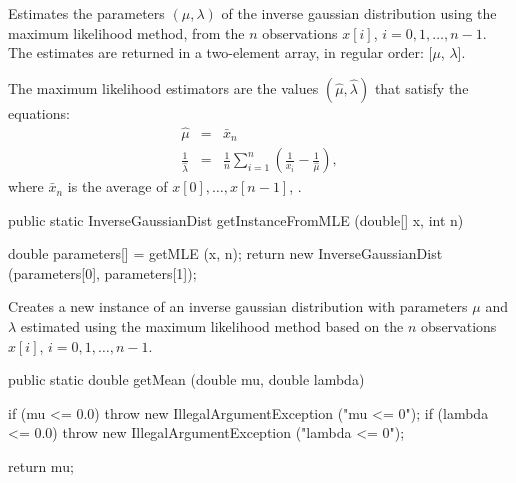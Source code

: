 \begin{tabb}
   Estimates the parameters $(\mu, \lambda)$ of the inverse gaussian distribution
   using the maximum likelihood method, from the $n$ observations
   $x[i]$, $i = 0, 1,\ldots, n-1$. The estimates are returned in a two-element
    array, in regular order: [$\mu$, $\lambda$]. 
   \begin{detailed}
   The maximum likelihood estimators are the values $(\hat\mu , \hat\lambda)$ 
   that satisfy the equations:
   \begin{eqnarray*}
      \hat{\mu} & = & \bar{x}_n \\[5pt]
      \frac{1}{\hat{\lambda}} & = & \frac{1}{n} \sum_{i=1}^{n}
    \left(\frac{1}{x_i} - \frac{1}{\hat{\mu}}\right),
   \end{eqnarray*}
   where $\bar x_n$ is the average of $x[0],\dots,x[n-1]$, 
    \cite[page 271]{tJOH95a}.
   \end{detailed}
\end{tabb}
\begin{htmlonly}
\end{htmlonly}
\begin{code}

   public static InverseGaussianDist getInstanceFromMLE (double[] x, int n)\begin{hide} {
      double parameters[] = getMLE (x, n);
      return new InverseGaussianDist (parameters[0], parameters[1]);
   }\end{hide}
\end{code}
\begin{tabb}
   Creates a new instance of an inverse gaussian distribution with parameters
   $\mu$ and $\lambda$ estimated using the maximum likelihood method based on
   the $n$ observations $x[i]$, $i = 0, 1, \ldots, n-1$.
\end{tabb}
\begin{htmlonly}
\end{htmlonly}
\begin{code}

   public static double getMean (double mu, double lambda)\begin{hide} {
      if (mu <= 0.0)
         throw new IllegalArgumentException ("mu <= 0");
      if (lambda <= 0.0)
         throw new IllegalArgumentException ("lambda <= 0");

      return mu;      
   }\end{hide}
\end{code}
